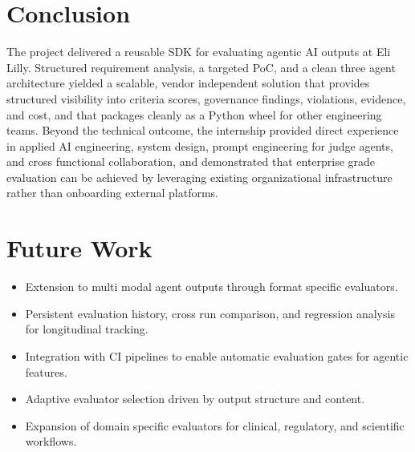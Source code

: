 \documentclass[12pt, a4paper, oneside]{report}
\begin{document}
\section{Conclusion}

The project delivered a reusable SDK for evaluating agentic AI outputs at Eli Lilly. Structured requirement analysis, a targeted PoC, and a clean three agent architecture yielded a scalable, vendor independent solution that provides structured visibility into criteria scores, governance findings, violations, evidence, and cost, and that packages cleanly as a Python wheel for other engineering teams. Beyond the technical outcome, the internship provided direct experience in applied AI engineering, system design, prompt engineering for judge agents, and cross functional collaboration, and demonstrated that enterprise grade evaluation can be achieved by leveraging existing organizational infrastructure rather than onboarding external platforms.

\section{Future Work}

\begin{itemize}
\item Extension to multi modal agent outputs through format specific evaluators.
\item Persistent evaluation history, cross run comparison, and regression analysis for longitudinal tracking.
\item Integration with CI pipelines to enable automatic evaluation gates for agentic features.
\item Adaptive evaluator selection driven by output structure and content.
\item Expansion of domain specific evaluators for clinical, regulatory, and scientific workflows.
\end{itemize}

\end{document}
